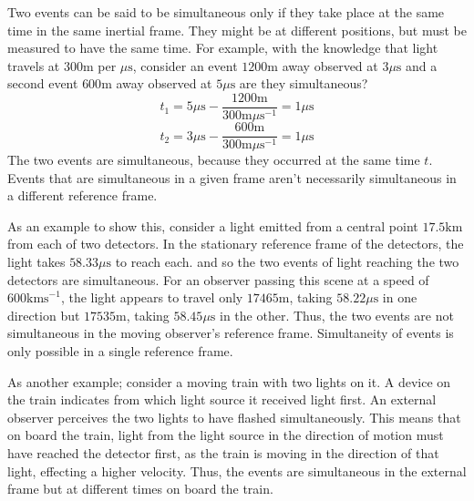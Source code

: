 \documentclass[12pt]{report}
\begin{document}
\begin{flushleft}
\bigskip
Two events can be said to be simultaneous only if they take place at the same
time in the same inertial frame. They might be at different positions, but must
be measured to have the same time. For example, with the knowledge that light
travels at \(300\mathrm{m}\) per \(\mu\mathrm{s}\), consider an event 
\(1200\mathrm{m}\) away observed at \(3\mu\mathrm{s}\) and a second event 
\(600\mathrm{m}\) away observed at \(5\mu\mathrm{s}\) are they 
simultaneous?
\[t_1 = 5\mu\mathrm{s} - \frac{1200\mathrm{m}}{300\mathrm{m}\mu\mathrm{s^{-1}}}
= 1\mu\mathrm{s}\]
\[t_2 = 3\mu\mathrm{s} - \frac{600\mathrm{m}}{300\mathrm{m}\mu\mathrm{s^{-1}}}
= 1\mu\mathrm{s}\]
The two events are simultaneous, because they occurred at the same time \(t\).
Events that are simultaneous in a given frame aren't necessarily simultaneous 
in a different reference frame.

\bigskip
As an example to show this, consider a light emitted from a central point 
\(17.5\mathrm{km}\) from each of two detectors. In the stationary reference
frame of the detectors, the light takes \(58.33\mu\mathrm{s}\) to reach each.
and so the two events of light reaching the two detectors are simultaneous.
For an observer passing this scene at a speed of \(600\mathrm{kms}^{-1}\), the
light appears to travel only \(17465\mathrm{m}\), taking \(58.22\mu\mathrm{s}\)
in one direction but \(17535\mathrm{m}\), taking \(58.45\mu\mathrm{s}\) in the
other. Thus, the two events are not simultaneous in the moving observer's
reference frame. Simultaneity of events is only possible in a single reference
frame.

\bigskip
As another example; consider a moving train with two lights on it. A device on
the train indicates from which light source it received light first. An 
external observer perceives the two lights to have flashed simultaneously. This
means that on board the train, light from the light source in the direction
of motion must have reached the detector first, as the train is moving in the
direction of that light, effecting a higher velocity. Thus, the events are 
simultaneous in the external frame but at different times on board the train.


\end{flushleft}
\end{document}
